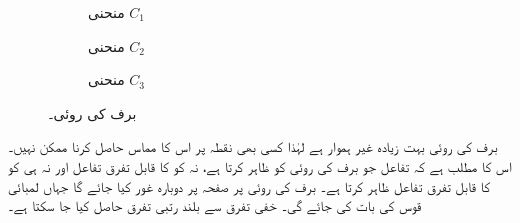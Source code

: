 \begin{figure}
\centering
\begin{subfigure}{0.22\textwidth}
\centering
{}
\caption{منحنی $C_1$}
\end{subfigure}\hfill
\begin{subfigure}{0.22\textwidth}
\centering
{}
\caption{منحنی $C_2$}
\end{subfigure}\hfill
\begin{subfigure}{0.22\textwidth}
\centering
{}
\caption{منحنی $C_3$}
\end{subfigure}
\caption{برف کی روئی۔}
\label{شکل_تفرق_روئی_برف}
\end{figure}

برف کی روئی بہت زیادہ غیر ہموار ہے لہٰذا کسی بھی نقطہ پر اس کا مماس حاصل کرنا ممکن نہیں۔ اس کا مطلب ہے کہ تفاعل  جو برف کی روئی کو ظاہر کرتا ہے،  نہ   کو   کا قابل تفرق تفاعل اور نہ ہی  کو  کا قابل تفرق تفاعل ظاہر  کرتا ہے۔ برف کی روئی پر صفحہ  پر دوبارہ غور کیا جائے گا جہاں لمبائی قوس کی بات کی جائے گی۔
خفی تفرق سے بلند رتبی تفرق حاصل کیا جا سکتا ہے۔


